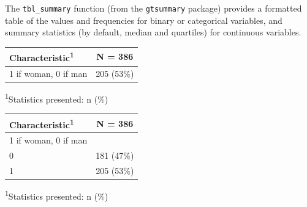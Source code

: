 \documentclass[]{book}
\newenvironment{Shaded}{\begin{snugshade}}{\end{snugshade}}
\newcommand{\CommentTok}[1]{\textcolor[rgb]{0.56,0.35,0.01}{\textit{#1}}}
\newcommand{\DataTypeTok}[1]{\textcolor[rgb]{0.13,0.29,0.53}{#1}}
\newcommand{\KeywordTok}[1]{\textcolor[rgb]{0.13,0.29,0.53}{\textbf{#1}}}
\newcommand{\NormalTok}[1]{#1}
\newcommand{\OperatorTok}[1]{\textcolor[rgb]{0.81,0.36,0.00}{\textbf{#1}}}
\newcommand{\StringTok}[1]{\textcolor[rgb]{0.31,0.60,0.02}{#1}}
\begin{document}
The \texttt{tbl\_summary} function (from the \texttt{gtsummary} package) provides a formatted table of the values and frequencies for binary or categorical variables, and summary statistics (by default, median and quartiles) for continuous variables.

\begin{Shaded}
\end{Shaded}

\captionsetup[table]{labelformat=empty,skip=1pt}
\begin{longtable}{lc}
\toprule
\textbf{Characteristic}\textsuperscript{1} & \textbf{N = 386} \\ 
\midrule
1 if woman, 0 if man & 205 (53\%) \\ 
\bottomrule
\end{longtable}
\vspace{-5mm}
\begin{minipage}{\linewidth}
\textsuperscript{1}Statistics presented: n (\%) \\ 
\end{minipage}

\begin{Shaded}
\end{Shaded}

\captionsetup[table]{labelformat=empty,skip=1pt}
\begin{longtable}{lc}
\toprule
\textbf{Characteristic}\textsuperscript{1} & \textbf{N = 386} \\ 
\midrule
1 if woman, 0 if man &  \\ 
0 & 181 (47\%) \\ 
1 & 205 (53\%) \\ 
\bottomrule
\end{longtable}
\vspace{-5mm}
\begin{minipage}{\linewidth}
\textsuperscript{1}Statistics presented: n (\%) \\ 
\end{minipage}
\end{document}

